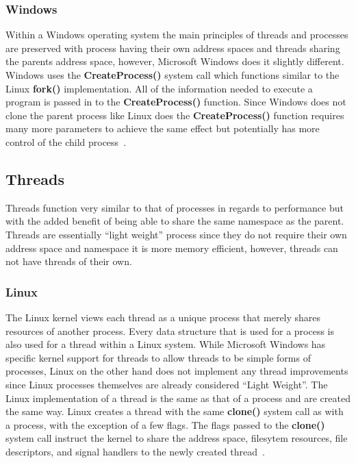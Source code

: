\documentclass[letterpaper,10pt,notitlepage,fleqn]{article}
\begin{document}
\subsubsection*{Windows}
Within a Windows operating system the main principles of threads and processes 
are preserved with process having their own address spaces and threads sharing 
the parents address space, however, Microsoft Windows does it slightly different. 
Windows uses the \textbf{CreateProcess()} system call which functions similar to 
the Linux \textbf{fork()} implementation. All of the information needed to execute 
a program is passed in to the \textbf{CreateProcess()} function. Since Windows does 
not clone the parent process like Linux does the \textbf{CreateProcess()} function 
requires many more parameters to achieve the same effect but potentially has more 
control of the child process~\cite{WI16}. 

\subsection{Threads}
Threads function very similar to that of processes in regards to performance but 
with the added benefit of being able to share the same namespace as the parent. 
Threads are essentially ``light weight'' process since they do not require their 
own address space and namespace it is more memory efficient, however, threads can 
not have threads of their own. 

\subsubsection*{Linux}
The Linux kernel views each thread as a unique process that merely shares resources 
of another process. Every data structure that is used for a process is also used 
for a thread within a Linux system. While Microsoft Windows has specific kernel 
support for threads to allow threads to be simple forms of processes, Linux on the 
other hand does not implement any thread improvements since Linux processes themselves 
are already considered ``Light Weight''. 
The Linux implementation of a thread is the same as that of a process and are created 
the same way. Linux creates a thread with the same \textbf{clone()} system call 
as with a process, with the exception of a few flags. 
The flags passed to the \textbf{clone()} system call instruct the kernel to share 
the address space, filesytem resources, file descriptors, and signal handlers to 
the newly created thread~\cite{LKD3}. 
\end{document}
